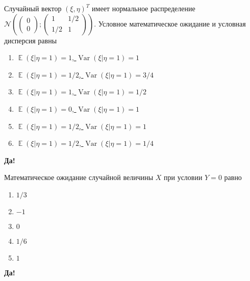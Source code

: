 \documentclass[t]{beamer}
\DeclareMathOperator{\Var}{Var}
\DeclareMathOperator{\E}{\mathbb{E}}
\newcommand{\cN}{\mathcal{N}}
\begin{document}
 \begin{frame} \label{28-Yes} 
\begin{block}{28} 

    Случайный вектор $(\xi, \eta)^T$ имеет нормальное распределение
    $\cN \left(
    \begin{pmatrix}
      0 \\
      0
    \end{pmatrix};
    \begin{pmatrix}
      1 & 1/2 \\
      1/2 & 1
    \end{pmatrix}
  \right)$. Условное математическое ожидание и условная дисперсия равны
  


 \end{block} 
\begin{enumerate} 
\item[] \hyperlink{28-No}{\beamergotobutton{} $\E(\xi | \eta=1)=1$, $\Var(\xi | \eta=1)=1$}
\item[] \hyperlink{28-Yes}{\beamergotobutton{} $\E(\xi | \eta=1)=1/2$, $\Var(\xi | \eta=1)=3/4$}
\item[] \hyperlink{28-No}{\beamergotobutton{} $\E(\xi | \eta=1)=1$, $\Var(\xi | \eta=1)=1/2$}
\item[] \hyperlink{28-No}{\beamergotobutton{} $\E(\xi | \eta=1)=0$, $\Var(\xi | \eta=1)=1$}
\item[] \hyperlink{28-No}{\beamergotobutton{} $\E(\xi | \eta=1)=1/2$, $\Var(\xi | \eta=1)=1$}
\item[] \hyperlink{28-No}{\beamergotobutton{} $\E(\xi | \eta=1)=1/2$, $\Var(\xi | \eta=1)=1/4$}
\end{enumerate} 

 \textbf{Да!} 
 \hyperlink{29}{}\end{frame} 


 \begin{frame} \label{29-Yes} 
\begin{block}{29} 

  Математическое ожидание случайной величины $X$ при условии $Y=0$ равно
  


 \end{block} 
\begin{enumerate} 
\item[] \hyperlink{29-No}{\beamergotobutton{} $1/3$}
\item[] \hyperlink{29-No}{\beamergotobutton{} $-1$}
\item[] \hyperlink{29-No}{\beamergotobutton{} $0$}
\item[] \hyperlink{29-No}{\beamergotobutton{} $1/6$}
\item[] \hyperlink{29-Yes}{\beamergotobutton{} $1$}
\end{enumerate} 

 \textbf{Да!} 
 \hyperlink{30}{}\end{frame} 
\end{document}
